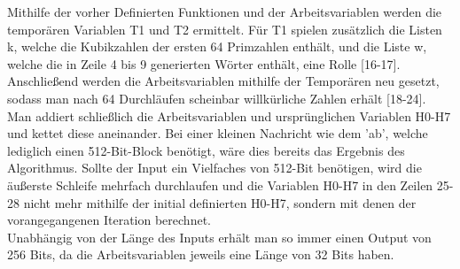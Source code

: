 Mithilfe der vorher Definierten Funktionen und der Arbeitsvariablen werden die temporären Variablen T1 und T2 ermittelt. 
Für T1 spielen zusätzlich die Listen k, welche die Kubikzahlen der ersten 64 Primzahlen enthält, und die Liste w, welche die in Zeile 4 bis 9 generierten Wörter enthält, eine Rolle [16-17].\\
Anschließend werden die Arbeitsvariablen mithilfe der Temporären neu gesetzt, sodass man nach 64 Durchläufen scheinbar willkürliche Zahlen erhält [18-24].\\
Man addiert schließlich die Arbeitsvariablen und ursprünglichen Variablen H0-H7 und kettet diese aneinander. Bei einer kleinen Nachricht wie dem 'ab', welche lediglich einen 512-Bit-Block benötigt, wäre dies bereits das Ergebnis des Algorithmus. Sollte der Input ein Vielfaches von 512-Bit benötigen, wird die äußerste Schleife mehrfach durchlaufen und die Variablen H0-H7 in den Zeilen 25-28 nicht mehr mithilfe der initial definierten H0-H7, sondern mit denen der vorangegangenen Iteration berechnet.\\
Unabhängig von der Länge des Inputs erhält man so immer einen Output von 256 Bits, da die Arbeitsvariablen jeweils eine Länge von 32 Bits haben.

